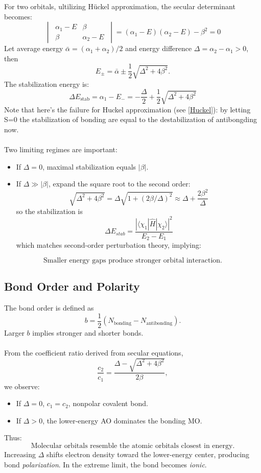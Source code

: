 	For two orbitals, ultilizing H\"uckel approximation, the secular determinant becomes:
%
	\[
	\begin{vmatrix}
	\ \alpha_1 - E & \beta       \ \\
	\ \beta        & \alpha_2 - E \ 
	\end{vmatrix} = 
	(\alpha_1 - E)(\alpha_2 - E) - \beta^2 = 0
	\]
%
	Let average energy $\bar{\alpha} = (\alpha_1+\alpha_2)/2$ 
	and energy difference $\Delta = \alpha_2-\alpha_1>0$, then
%
	\[
	E_\pm = \bar{\alpha} \pm \frac{1}{2} \sqrt{\Delta^2 + 4\beta^2}.
	\]
%
	The stabilization energy is:
%
	\[
	\Delta E_{\text{stab}} 
	= \alpha_1 - E_- 
	= -\frac{\Delta}{2} + \frac{1}{2}\sqrt{\Delta^2 + 4\beta^2}
	\]
%	
	Note that here's the failure for Huckel approximation (see \ref{Huckel}): 
	by letting S=0 the stabilization of bonding are equal to the destabilization of antibongding now. \label{sym} \\ \\
%
	Two limiting regimes are important:
%
	\begin{itemize}
	\item If $\Delta = 0$, maximal stabilization equals $|\beta|$.
	\item If $\Delta \gg |\beta|$, expand the square root to the second order:
%	
	\[
	\sqrt{\Delta^2+4\beta^2} = 
	\Delta\sqrt{1+(2\beta/\Delta)^2} \approx 
	\Delta + \frac{2\beta^2}{\Delta}
	\]
%	
	so the stabilization is
%	
	\[
	\Delta E_{stab} = 
	\frac{\left| \langle\chi_1|\hat{H}|\chi_2\rangle \right|^2}{E_2-E_1}
	\]
%	
	which matches second-order perturbation theory, implying:
	\end{itemize}
%
	\[
	\boxed{\text{Smaller energy gaps produce stronger orbital interaction.}}
	\]\label{closer energy}

\subsection{Bond Order and Polarity}\label{polar}

	The bond order is defined as
%
	\[
	b = \frac{1}{2}
	(N_{\text{bonding}} - N_{\text{antibonding}}).
	\]
%
	Larger $b$ implies stronger and shorter bonds.\\ \\
%
	From the coefficient ratio derived from secular equations,
%
	\[
	\frac{c_2}{c_1}
	=
	\frac{\Delta - \sqrt{\Delta^2 + 4\beta^2}}{2\beta},
	\]
%
	we observe:
%
	\begin{itemize}
	\item If $\Delta = 0$, $c_1 = c_2$, nonpolar covalent bond.
	\item If $\Delta > 0$, the lower-energy AO dominates the bonding MO.
	\end{itemize}
%
	Thus:
%
	\[
	\boxed{\text{Molecular orbitals resemble the atomic orbitals closest in energy.}}
	\]
%
	Increasing $\Delta$ shifts electron density toward the lower-energy center, 
	producing bond \emph{polarization}. 
	In the extreme limit, the bond becomes \emph{ionic}.	
	
